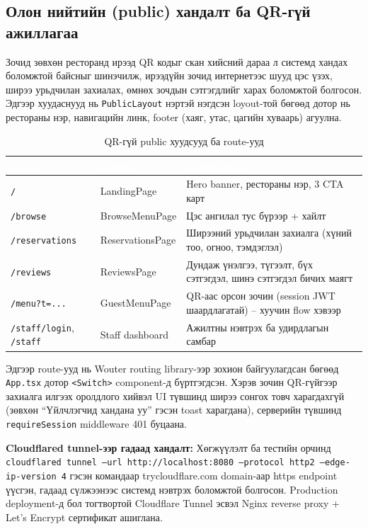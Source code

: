 \subsection{Олон нийтийн (public) хандалт ба QR-гүй ажиллагаа}

Зочид зөвхөн ресторанд ирээд QR кодыг скан хийсний дараа л системд хандах
боломжтой байсныг шинэчилж, ирээдүйн зочид интернетээс шууд цэс үзэх, ширээ
урьдчилан захиалах, өмнөх зочдын сэтгэгдлийг харах боломжтой болгосон.
Эдгээр хуудаснууд нь \texttt{PublicLayout} нэртэй нэгдсэн loyout-той бөгөөд
дотор нь рестораны нэр, навигацийн линк, footer (хаяг, утас, цагийн хуваарь)
агуулна.

\begin{table}[htbp]
\caption{QR-гүй public хуудсууд ба route-ууд}
\label{tab:public}
\centering
\small
\begin{tabularx}{\textwidth}{|l|l|L|}
\hline
{}
\textcolor{white}{\textbf{Route}} &
\textcolor{white}{\textbf{Хуудас}} &
\textcolor{white}{\textbf{Үндсэн үүрэг}} \\ \hline
\texttt{/} & LandingPage & Hero banner, рестораны нэр, 3 CTA карт \\ \hline
{}
\texttt{/browse} & BrowseMenuPage & Цэс ангилал тус бүрээр + хайлт \\ \hline
\texttt{/reservations} & ReservationsPage & Ширээний урьдчилан захиалга
  (хүний тоо, огноо, тэмдэглэл) \\ \hline
{}
\texttt{/reviews} & ReviewsPage & Дундаж үнэлгээ, түгээлт, бүх сэтгэгдэл,
  шинэ сэтгэгдэл бичих маягт \\ \hline
\texttt{/menu?t=...} & GuestMenuPage & QR-аас орсон зочин (session JWT
  шаардлагатай) -- хуучин flow хэвээр \\ \hline
{}
\texttt{/staff/login}, \texttt{/staff} & Staff dashboard & Ажилтны нэвтрэх ба
  удирдлагын самбар \\ \hline
\end{tabularx}
\end{table}

Эдгээр route-ууд нь Wouter routing library-ээр зохион байгуулагдсан бөгөөд
\texttt{App.tsx} дотор \texttt{<Switch>} component-д бүртгэгдсэн. Хэрэв зочин
QR-гүйгээр захиалга илгээх оролдлого хийвэл UI түвшинд ширээ сонгох товч
харагдахгүй (зөвхөн ``Үйлчлэгчид хандана уу'' гэсэн toast харагдана), серверийн
түвшинд \texttt{requireSession} middleware 401 буцаана.

\textbf{Cloudflared tunnel-ээр гадаад хандалт:} Хөгжүүлэлт ба тестийн орчинд
\texttt{cloudflared tunnel --url http://localhost:8080 --protocol http2 --edge-ip-version 4}
гэсэн командаар trycloudflare.com domain-аар https endpoint үүсгэн, гадаад
сүлжээнээс системд нэвтрэх боломжтой болгосон. Production deployment-д бол
тогтвортой Cloudflare Tunnel эсвэл Nginx reverse proxy + Let's Encrypt
сертификат ашиглана.

